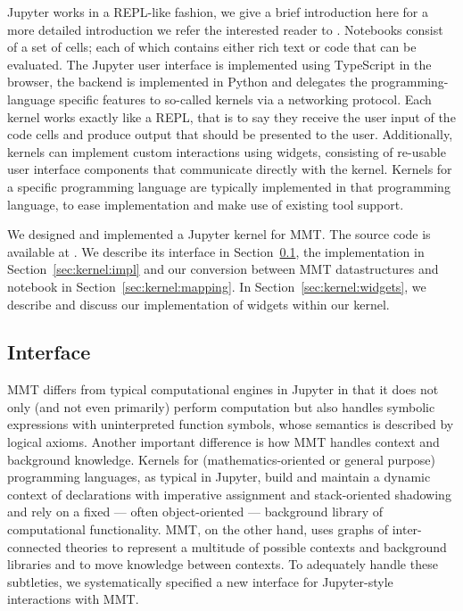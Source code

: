 Jupyter works in a REPL-like fashion, we give a brief introduction here for a more detailed introduction we refer the interested reader to \cite{jupyter-doc:on}. 
Notebooks consist of a set of cells; each of which contains either rich text or code that can be evaluated. 
The Jupyter user interface is implemented using TypeScript in the browser, the backend is implemented in Python and delegates the programming-language specific features to so-called kernels via a networking protocol. 
Each kernel works exactly like a REPL, that is to say they receive the user input of the code cells and produce output that should be presented to the user. 
Additionally, kernels can implement custom interactions using widgets, consisting of re-usable user interface components that communicate directly with the kernel.  
Kernels for a specific programming language are typically implemented in that programming language, to ease implementation and make use of existing tool support. 

We designed and implemented a Jupyter kernel for MMT. 
The source code is available at \cite{mmt_jupyter:on}. 
We describe its interface in Section~\ref{sec:kernel:syntax}, the implementation in Section~\ref{sec:kernel:impl} and our conversion between MMT datastructures and notebook in Section~\ref{sec:kernel:mapping}.
In Section~\ref{sec:kernel:widgets}, we describe and discuss our implementation of widgets within our kernel. 

\subsection{Interface}\label{sec:kernel:syntax}

MMT differs from typical computational engines in Jupyter in that it does not only (and not even primarily) perform computation but also handles symbolic expressions with uninterpreted function symbols, whose semantics is described by logical axioms.
Another important difference is how MMT handles context and background knowledge.
Kernels for (mathematics-oriented or general purpose) programming languages, as typical in Jupyter, build and maintain a dynamic context of declarations with imperative assignment and stack-oriented shadowing and rely on a fixed --- often object-oriented --- background library of computational functionality.
MMT, on the other hand, uses graphs of inter-connected theories to represent a multitude of possible contexts and background libraries and to move knowledge between contexts.
To adequately handle these subtleties, we systematically specified a new interface for Jupyter-style interactions with MMT.


